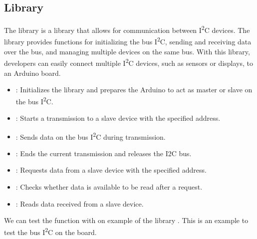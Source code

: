 \subsection{Library }

The library  is a library that allows for communication between I\textsuperscript{2}C devices.  The library  provides functions for initializing the bus I\textsuperscript{2}C, sending and receiving data over the bus, and managing multiple devices on the same bus. With this library, developers can easily connect multiple I\textsuperscript{2}C devices, such as sensors or displays, to an Arduino board.\cite{arduinoLCDI2C:2023,Aristi:2021}


\begin{itemize}
	
	\item {}: Initializes the library  and prepares the Arduino to act as master or slave on the bus I\textsuperscript{2}C.
	\item {}: Starts a transmission to a slave device with the specified address.
	\item {} : Sends data on the bus I\textsuperscript{2}C during transmission.
	\item {} : Ends the current transmission and releases the I2C bus.
	\item {} : Requests data from a slave device with the specified address.
	\item {}: Checks whether data is available to be read after a request.
	\item {}: Reads data received from a slave device.
	
\end{itemize}

\bigskip

We can test the function with on example of the library . This is an example to 
test the bus I\textsuperscript{2}C on the board. 

\begin{center}
	
	\label{TestWire}
	
\end{center}


